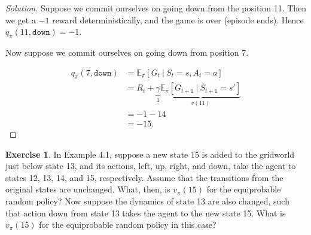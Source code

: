\documentclass[oneside,11pt]{article}
\theoremstyle{definition}
\newtheorem{exer}[thm]{Exercise}
\newcommand{\EE}{\mathbb{E}}
\newcommand{\EEpi}{\mathbb{E}_{\pi}}
\newcommand{\vpi}{v_{\pi}}
\newcommand{\qpi}{q_{\pi}}
\newcommand\givenbase[1][]{\:#1\lvert\:}
\let\given\givenbase
\newenvironment{solution}
{\renewcommand\qedsymbol{$\blacksquare$}\begin{proof}[Solution]} {\end{proof}}
\begin{document}
\begin{shaded}
\begin{solution} 

Suppose we commit ourselves on going down from the position 11. Then we get a $-1$ reward deterministically, and the game is over (episode ends). Hence $\qpi(11,\texttt{down}) = -1$. 

Now suppose we commit ourselves on going down from position 7.  

\begin{equation*} %
\begin{split}
\qpi(7,\texttt{down}) & = \EEpi [ G_t \given  S_t = s, A_t = a] \\
& = R_t + \underbrace{\gamma}_{1} \underbrace{\EE_\pi [ G_{t+1} \given S_{t+1} = s']}_{  v(11) } \\
& = -1 -14 \\
& = -15.
\end{split}
\end{equation*}


\end{solution} 
\end{shaded}

\begin{exer}
In Example 4.1, suppose a new state 15 is added to the gridworld just below state 13, and its actions, left, up, right, and down, take the agent to states 12, 13, 14, and 15, respectively. Assume that the transitions from the original states are unchanged. What, then, is $\vpi(15)$ for the equiprobable random policy? Now suppose the dynamics of state 13 are also changed, such that action down from state 13 takes the agent to the new state 15. What is $\vpi(15)$ for the equiprobable random policy in this case?
\end{exer}
\end{document}
